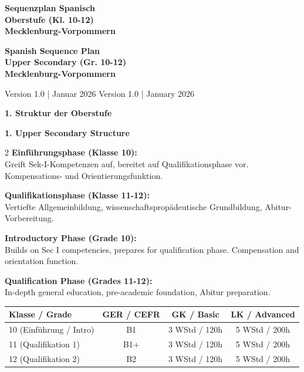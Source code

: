 \documentclass[10pt,a4paper]{article}
\newcommand{\bil}[2]{%
\begin{paracol}{2}
\small #1
\switchcolumn
\small\textcolor{english}{#2}
\end{paracol}
}
\newcommand{\secbil}[2]{%
\vspace{8pt}
\noindent\colorbox{spanisch}{\parbox{0.48\textwidth}{\color{white}\bfseries #1}}%
\hfill%
\colorbox{english}{\parbox{0.48\textwidth}{\color{white}\bfseries #2}}
\vspace{4pt}
}
\begin{document}
\begin{center}
\colorbox{spanisch}{\parbox{0.48\textwidth}{\centering\color{white}\Large\bfseries\vspace{4pt}
Sequenzplan Spanisch\\Oberstufe (Kl. 10-12)\\Mecklenburg-Vorpommern
\vspace{4pt}}}%
\hfill%
\colorbox{english}{\parbox{0.48\textwidth}{\centering\color{white}\Large\bfseries\vspace{4pt}
Spanish Sequence Plan\\Upper Secondary (Gr. 10-12)\\Mecklenburg-Vorpommern
\vspace{4pt}}}
\end{center}

\vspace{2mm}
\begin{center}
\small Version 1.0 | Januar 2026 \hfill \textcolor{english}{Version 1.0 | January 2026}
\end{center}

\vspace{4mm}

\secbil{1. Struktur der Oberstufe}{1. Upper Secondary Structure}

\bil{%
\textbf{Einführungsphase (Klasse 10):}\\
Greift Sek-I-Kompetenzen auf, bereitet auf Qualifikationsphase vor. Kompensations- und Orientierungsfunktion.

\textbf{Qualifikationsphase (Klasse 11-12):}\\
Vertiefte Allgemeinbildung, wissenschaftspropädeutische Grundbildung, Abitur-Vorbereitung.
}{%
\textbf{Introductory Phase (Grade 10):}\\
Builds on Sec I competencies, prepares for qualification phase. Compensation and orientation function.

\textbf{Qualification Phase (Grades 11-12):}\\
In-depth general education, pre-academic foundation, Abitur preparation.
}

\vspace{2mm}

\begin{center}
\small
\begin{tabular}{|l|c|c|c|}
\hline
\rowcolor{lightgray}
\textbf{Klasse / Grade} & \textbf{GER / CEFR} & \textbf{GK / Basic} & \textbf{LK / Advanced} \\
\hline
10 (Einführung / Intro) & B1 & 3 WStd / 120h & 5 WStd / 200h \\
\hline
11 (Qualifikation 1) & B1+ & 3 WStd / 120h & 5 WStd / 200h \\
\hline
12 (Qualifikation 2) & B2 & 3 WStd / 120h & 5 WStd / 200h \\
\hline
\end{tabular}
\end{center}
\end{document}
